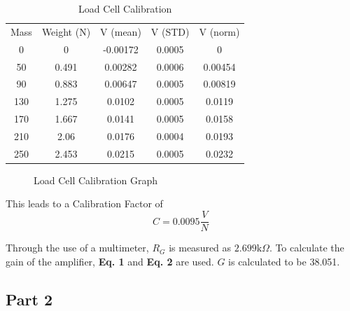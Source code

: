 \documentclass{article}
\begin{document}
\begin{table}[H]
    \centering
    \begin{tabular}{ccccc}
         Mass&  Weight (N)&  V (mean)&  V (STD)&  V (norm)   \\
         0&  0&  -0.00172&  0.0005&  0   \\
         50&  0.491&  0.00282&  0.0006&  0.00454   \\
         90&  0.883&  0.00647&  0.0005&  0.00819   \\
         130&  1.275&  0.0102&  0.0005&  0.0119  \\
 170& 1.667& 0.0141& 0.0005& 0.0158 \\
 210& 2.06& 0.0176& 0.0004& 0.0193 \\
 250& 2.453& 0.0215& 0.0005& 0.0232 \\
    \end{tabular}
    \caption{Load Cell Calibration}
    \label{tab:my_label}
\end{table}

\begin{figure}[H]
    \centering
    \caption{Load Cell Calibration Graph}
    \label{fig:loadcellcalib2}
\end{figure}

This leads to a Calibration Factor of \begin{equation} C = 0.0095 \dfrac{V}{N}\ \end{equation}

Through the use of a multimeter, \(R_{G}\) is measured as \(2.699\text{k}\Omega\).  To calculate the gain of the amplifier, \textbf{Eq. 1} and \textbf{Eq. 2} are used. \(G\) is calculated to be 38.051.
\subsection{Part 2} 
\end{document}
